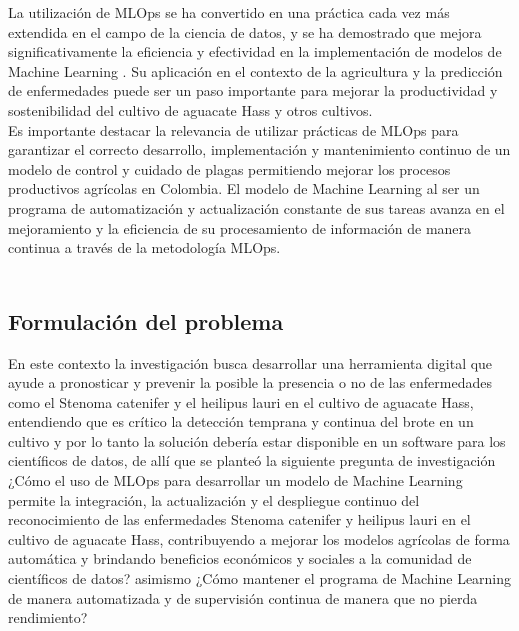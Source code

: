 La utilización de MLOps se ha convertido en una práctica cada vez más extendida en el campo de la ciencia de datos, y se ha demostrado que mejora significativamente la eficiencia y efectividad en la implementación de modelos de Machine Learning \citet{geron2019hands}. Su aplicación en el contexto de la agricultura y la predicción de enfermedades puede ser un paso importante para mejorar la productividad y sostenibilidad del cultivo de aguacate Hass y otros cultivos.\\

Es importante destacar la relevancia de utilizar prácticas de MLOps para garantizar el correcto desarrollo, implementación y mantenimiento continuo de un modelo de control y cuidado de plagas permitiendo mejorar los procesos productivos agrícolas en Colombia. El modelo de Machine Learning al ser un programa de automatización y actualización constante de sus tareas avanza en el mejoramiento y la eficiencia de su procesamiento de información de manera continua a través de la metodología MLOps.
\\\\




\subsection{Formulación del problema}
En este contexto la investigación busca desarrollar una herramienta digital que ayude a pronosticar y prevenir la posible la presencia o no de las enfermedades como el Stenoma catenifer y el heilipus lauri en el cultivo de aguacate Hass, entendiendo que es crítico la detección temprana y continua del brote en un cultivo y por lo tanto la solución debería estar disponible en un software para los científicos de datos, de allí que se planteó la siguiente pregunta de investigación ¿Cómo el uso de MLOps para desarrollar un modelo de Machine Learning permite la integración, la actualización y el despliegue continuo del reconocimiento de las enfermedades Stenoma catenifer y heilipus lauri en el cultivo de aguacate Hass, contribuyendo a mejorar los modelos agrícolas de forma automática y brindando beneficios económicos y sociales a la comunidad de científicos de datos? asimismo ¿Cómo mantener el programa de Machine Learning de manera automatizada y de supervisión continua de manera que no pierda rendimiento?
